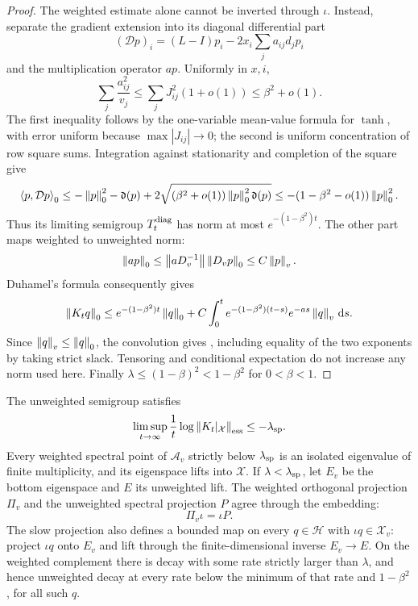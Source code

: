 \begin{proof}
The weighted estimate alone cannot be inverted through $\iota$.
Instead, separate the gradient extension into its diagonal differential
part
\[
 (\mathcal Dp)_i=(L-I)p_i-2x_i\sum_j a_{ij}d_jp_i
\]
and the multiplication operator $ap$.  Uniformly in $x,i$,
\begin{equation}\label{eq:exact-sharp-row}
 \sum_j\frac{a_{ij}^2}{v_j}
 \le\sum_jJ_{ij}^2(1+o(1))\le\beta^2+o(1).
\end{equation}
The first inequality follows by the one-variable mean-value formula for
$\tanh$, with error uniform because $\max|J_{ij}|\to0$; the second is
uniform concentration of row square sums.  Integration against stationarity
and completion of the square give
\[
 \left\langle p,\mathcal Dp\right\rangle_0
 \le-\left\lVert p\right\rVert_0^2-\mathfrak d(p)
   +2\sqrt{(\beta^2+o(1))\left\lVert p\right\rVert_0^2\mathfrak d(p)}
 \le-(1-\beta^2-o(1))\left\lVert p\right\rVert_0^2.
\]
Thus its limiting semigroup $T_t^{\rm diag}$ has norm at most
$e^{-(1-\beta^2)t}$.  The other part maps weighted to unweighted norm:
\[
 \left\lVert ap\right\rVert_0\le\left\lVert aD_v^{-1}\right\rVert\left\lVert D_vp\right\rVert_0\le C\left\lVert p\right\rVert_v.
\]
Duhamel's formula consequently gives
\[
 \left\lVert K_tq\right\rVert_0
 \le e^{-(1-\beta^2)t}\left\lVert q\right\rVert_0
 +C\int_0^t e^{-(1-\beta^2)(t-s)}e^{-as}\left\lVert q\right\rVert_v\,\mathrm d s.
\]
Since $\left\lVert q\right\rVert_v\le\left\lVert q\right\rVert_0$, the convolution gives
, including equality of the two exponents
by taking strict slack.  Tensoring and conditional expectation do not
increase any norm used here.  Finally
$\lambda\le(1-\beta)^2<1-\beta^2$ for $0<\beta<1$.
\end{proof}

\begin{proposition}
\label{prop:exact-isolation}
The unweighted semigroup satisfies
\begin{equation}\label{eq:exact-essential-rate}
 \limsup_{t\to\infty}\frac1t
       \log\left\lVert K_t|_{\mathcal X}\right\rVert_{\rm ess}
 \le-\lambda_{\rm sp}.
\end{equation}
Every weighted spectral point of $\mathcal A_v$ strictly below
$\lambda_{\rm sp}$ is an isolated eigenvalue of finite multiplicity, and
its eigenspace lifts into $\mathcal X$.  If
$\lambda<\lambda_{\rm sp}$, let $E_v$ be the bottom eigenspace and $E$ its
unweighted lift.  The weighted orthogonal projection $\Pi_v$ and the
unweighted spectral projection $P$ agree through the embedding:
\begin{equation}\label{eq:exact-projection-agreement}
 \Pi_v\iota=\iota P.
\end{equation}
The slow projection also defines a bounded map on every $q\in\mathcal H$
with $\iota q\in\mathcal X_v$: project $\iota q$ onto $E_v$ and lift
through the finite-dimensional inverse $E_v\to E$.  On the weighted
complement there is decay with some rate strictly larger than $\lambda$,
and hence unweighted decay at every rate below the minimum of that rate
and $1-\beta^2$, for all such $q$.
\end{proposition}

